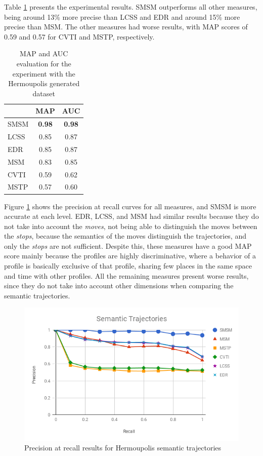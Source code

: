 \documentclass[12pt]{article}
\begin{document}
Table \ref{tab:hermoupolis_measures_map_auc} presents the experimental results. SMSM outperforms all other measures, being around 13\% more precise than LCSS and EDR and around 15\% more precise than MSM. The other measures had worse results, with MAP scores of 0.59 and 0.57 for CVTI and MSTP, respectively.

\begin{table}[ht!]
  \scriptsize
  \centering
  \begin{tabular}{|l|c|c|}
  	\hline
 & MAP & AUC\\
  	\hline
SMSM & \textbf{0.98} & \textbf{0.98}\\
LCSS & 0.85 & 0.87 \\
 EDR & 0.85 & 0.87 \\
 MSM & 0.83 & 0.85 \\
CVTI & 0.59 & 0.62 \\
MSTP & 0.57 & 0.60 \\
    \hline
  \end{tabular}
  \caption{MAP and AUC evaluation for the experiment with the Hermoupolis generated dataset}
  \label{tab:hermoupolis_measures_map_auc}
\end{table}

Figure \ref{fig:hermoupolis_precision_recall} shows the precision at recall curves for all measures, and SMSM is more accurate at each level. EDR, LCSS, and MSM had similar results because they do not take into account the \emph{moves}, not being able to distinguish the moves between the \emph{stops}, because the semantics of the moves distinguish the trajectories, and only the \emph{stops} are not sufficient. Despite this, these measures have a good MAP score mainly because the profiles are highly discriminative, where a behavior of a profile is basically exclusive of that profile, sharing few places in the same space and time with other profiles. All the remaining measures present worse results, since they do not take into account other dimensions when comparing the semantic trajectories.

\begin{figure}[ht!]
\centerline{
\centering
\includegraphics[width=.6\textwidth]{Images/P_R-chart_Hermoupolis_semantic.png}
}
\caption{Precision at recall results for Hermoupolis semantic trajectories}
\label{fig:hermoupolis_precision_recall}
\end{figure}
\end{document}
